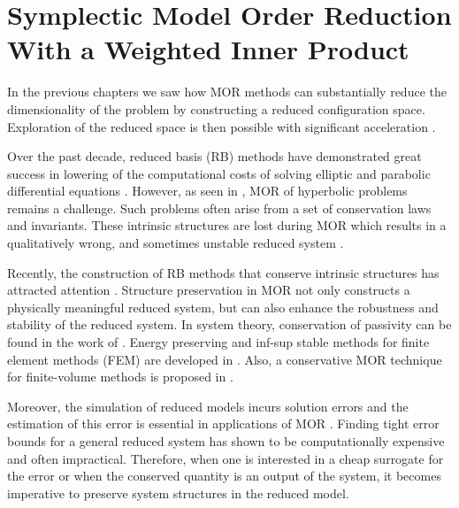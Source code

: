 \chapter{Symplectic Model Order Reduction With a Weighted Inner Product} \label{chapter:5}

In the previous chapters we saw how MOR methods can substantially reduce the dimensionality of the problem by constructing a reduced configuration space. Exploration of the reduced space is then possible with significant acceleration \cite{hesthaven2015certified,Haasdonk2017}.

Over the past decade, reduced basis (RB) methods have demonstrated great success in lowering of the computational costs of solving elliptic and parabolic differential equations \cite{ito1998reduced,ito2001reduced}. However, as seen in , MOR of hyperbolic problems remains a challenge. Such problems often arise from a set of conservation laws and invariants. These intrinsic structures are lost during MOR which results in a qualitatively wrong, and sometimes unstable reduced system \cite{Amsallem:2014ef}.

Recently, the construction of RB methods that conserve intrinsic structures has attracted attention \cite{doi:10.1137/17M1111991,doi:10.1137/17M1111991,kalashnikova2014stabilization,farhat2015structure,doi:10.1137/110836742,doi:10.1137/140959602,beattie2011structure,doi:10.1137/140978922}. Structure preservation in MOR not only constructs a physically meaningful reduced system, but can also enhance the robustness and stability of the reduced system. In system theory, conservation of passivity can be found in the work of \cite{polyuga2010structure,gugercin2012structure}. Energy preserving and inf-sup stable methods for finite element methods (FEM) are developed in \cite{farhat2015structure,ballarin2015supremizer}. Also, a conservative MOR technique for finite-volume methods is proposed in \cite{1711.11550}.

Moreover, the simulation of reduced models incurs solution errors and the estimation of this error is essential in applications of MOR \cite{HaasdonkOhlberger11,RuinerEtAl12,BhattEtAl18}. Finding tight error bounds for a general reduced system has shown to be computationally expensive and often impractical. Therefore, when one is interested in a cheap surrogate for the error or when the conserved quantity is an output of the system, it becomes imperative to preserve system structures in the reduced model.

